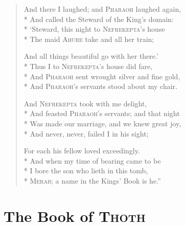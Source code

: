 \documentclass[12pt]{article}
\newcommand{\vin}{\hspace{1em}}
\begin{document}
\begin{verse}
And there I laughed; and \textsc{Pharaoh} laughed again,\\*
And called the Steward of the King's domain:\\*
\vin `Steward, this night to \textsc{Nefrekepta}'s house\\*
The maid \textsc{Ahure} take and all her train;

And all things beautiful go with her there.'\\*
Thus I to \textsc{Nefrekepta}'s house did fare,\\*
\vin And \textsc{Pharaoh} sent wrought silver and fine gold,\\*
And \textsc{Pharaoh}'s servants stood about my chair.

And \textsc{Nefrekepta} took with me delight,\\*
And feasted \textsc{Pharaoh}'s servants; and that night\\*
\vin Was made our marriage, and we knew great joy,\\*
And never, never, failed I in his sight;

For each his fellow loved exceedingly.\\*
And when my time of bearing came to be\\*
\vin I bore the son who lieth in this tomb,\\*
\textsc{Merab}; a name in the Kings' Book is he.''
\end{verse}


\section*{The Book of \textsc{Thoth}}
\end{document}

